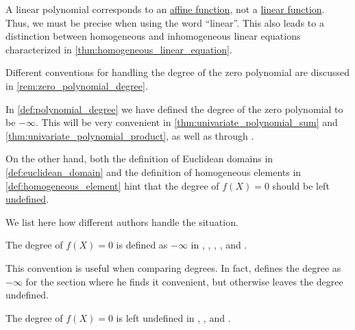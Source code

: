 \begin{comments}
  \item A linear polynomial corresponds to an \hyperref[def:affine_operator]{affine function}, not a \hyperref[def:linear_function]{linear function}. Thus, we must be precise when using the word \enquote{linear}. This also leads to a distinction between homogeneous and inhomogeneous linear equations characterized in \cref{thm:homogeneous_linear_equation}.

  \item Different conventions for handling the degree of the zero polynomial are discussed in \cref{rem:zero_polynomial_degree}.
\end{comments}

\begin{remark}\label{rem:zero_polynomial_degree}
  In \cref{def:polynomial_degree} we have defined the degree of the zero polynomial to be \( -\infty \). This will be very convenient in \cref{thm:univariate_polynomial_sum} and \cref{thm:univariate_polynomial_product}, as well as through .

  On the other hand, both the definition of Euclidean domains in \cref{def:euclidean_domain} and the definition of homogeneous elements in \cref{def:homogeneous_element} hint that the degree of \( f(X) = 0 \) should be left \hyperref[con:undefinedness]{undefined}.

  We list here how different authors handle the situation.

  \begin{thmenum}
     The degree of \( f(X) = 0 \) is defined as \( -\infty \) in
    \cite[97]{Lang2002Algebra},
    \cite[128]{Jacobson1985BasicAlgebraI},
    \cite[125]{Aluffi2009Algebra},
    \cite[28]{Ahlfors1979ComplexAnalysis},
    \cite[93]{Винберг2014КурсАлгебры} and
    \cite[183]{Кострикин2020АлгебраЧасть1}.

    This convention is useful when comparing degrees. In fact, \textcite[155]{Knapp2016BasicAlgebra} defines the degree as \( -\infty \) for the section where he finds it convenient, but otherwise leaves the degree undefined.

     The degree of \( f(X) = 0 \) is left undefined in
    \cite[42]{Rotman2015AdvancedModernAlgebraPart1},
    \cite[118]{Тыртышников2017ОсновыАлгебры},
    \cite[132]{Курош1968КурсВысшейАлгебры} and
    \cite[22]{ГеновМиховскиМоллов1991Алгебра}.


\end{thmenum}
\end{remark}
